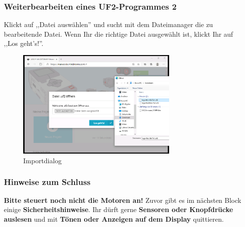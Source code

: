 \documentclass{beamer}
\begin{document}
\begin{frame}
\frametitle{Weiterbearbeiten eines UF2-Programmes 2}
Klickt auf ,,Datei auswählen'' und sucht mit dem Dateimanager die zu bearbeitende Datei. Wenn Ihr die richtige Datei ausgewählt ist, klickt Ihr auf ,,Los geht's!''.

\begin{figure}
  \includegraphics[width=8cm]{mkcd04.png}
  \caption{Importdialog}
  \label{fig:mkcd4}
\end{figure}
\end{frame}

\begin{frame}
\frametitle{Hinweise zum Schluss}

\textbf{Bitte steuert noch nicht die Motoren an!} Zuvor gibt es im nächsten Block einige \textbf{Sicherheitshinweise}. Ihr dürft gerne \textbf{Sensoren oder Knopfdrücke auslesen} und mit \textbf{Tönen oder Anzeigen auf dem Display}  quittieren.

\end{frame}

\end{document}
